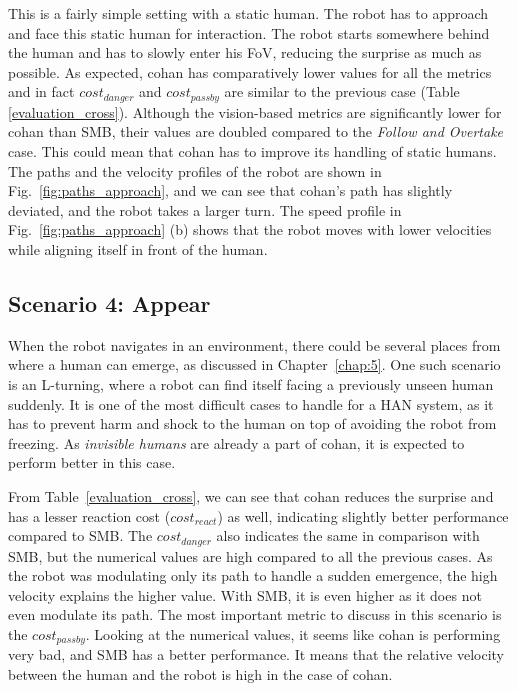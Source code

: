 This is a fairly simple setting with a static human. The robot has to approach and face this static human for interaction. The robot starts somewhere behind the human and has to slowly enter his FoV, reducing the surprise as much as possible. As expected, \acrshort{cohan} has comparatively lower values for all the metrics and in fact $cost_{danger}$ and $cost_{passby}$ are similar to the previous case (Table \ref{evaluation_cross}). Although the vision-based metrics are significantly lower for \acrshort{cohan} than SMB, their values are doubled compared to the \textit{Follow and Overtake} case. This could mean that \acrshort{cohan} has to improve its handling of static humans. The paths and the velocity profiles of the robot are shown in Fig.~\ref{fig:paths_approach}, and we can see that \acrshort{cohan}'s path has slightly deviated, and the robot takes a larger turn. The speed profile in Fig.~\ref{fig:paths_approach} (b) shows that the robot moves with lower velocities while aligning itself in front of the human.

\subsection{Scenario 4: Appear}
When the robot navigates in an environment, there could be several places from where a human can emerge, as discussed in Chapter~\ref{chap:5}. One such scenario is an L-turning, where a robot can find itself facing a previously unseen human suddenly. It is one of the most difficult cases to handle for a HAN system, as it has to prevent harm and shock to the human on top of avoiding the robot from freezing. As \textit{invisible humans} are already a part of \acrshort{cohan}, it is expected to perform better in this case.

From Table~\ref{evaluation_cross}, we can see that \acrshort{cohan} reduces the surprise and has a lesser reaction cost ($cost_{react}$) as well, indicating slightly better performance compared to SMB. The $cost_{danger}$ also indicates the same in comparison with SMB, but the numerical values are high compared to all the previous cases. As the robot was modulating only its path to handle a sudden emergence, the high velocity explains the higher value. With SMB, it is even higher as it does not even modulate its path. The most important metric to discuss in this scenario is the $cost_{passby}$. Looking at the numerical values, it seems like \acrshort{cohan} is performing very bad, and SMB has a better performance. It means that the relative velocity between the human and the robot is high in the case of \acrshort{cohan}.

